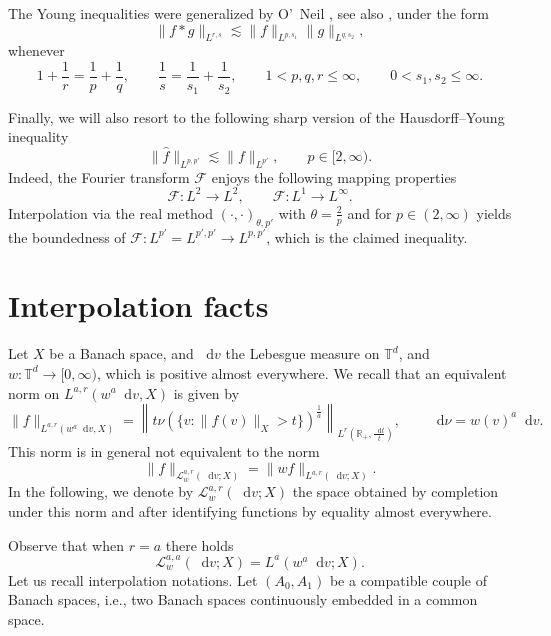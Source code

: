 \documentclass[11pt,a4paper,reqno]{amsart}
\theoremstyle{plain}
\theoremstyle{remark}
\newcommand{\dd}{\mathop{}\!\mathrm{d}}
\begin{document}
The Young inequalities were generalized by O'~Neil \cite{Oneil1963}, see also \cite[p. 73]{grafakos2011classical}, under the form
\begin{equation}
    \label{eq.young-oneil}
    \|f*g\|_{L^{r,s}} \lesssim \|f\|_{L^{p,s_1}}\|g\|_{L^{q,s_2}}, 
\end{equation}
whenever
\[
    1+\frac{1}{r}=\frac{1}{p}+\frac{1}{q}, \qquad \frac{1}{s}=\frac{1}{s_1} + \frac{1}{s_2}, \qquad 1 < p, q, r \leq \infty, \qquad 0<s_1,s_2\leq \infty. 
\]

Finally, we will also resort to the following sharp version of the Hausdorff--Young inequality 
\begin{equation}
    \label{eq.hausdorffYoung-real}
    \|\widehat{f}\|_{L^{p,p'}} \lesssim \|f\|_{L^{p'}}, \qquad p \in [2,\infty).  
\end{equation}
Indeed, the Fourier transform $\mathcal{F}$ enjoys the following mapping properties
\[
    \mathcal{F} : L^2 \to L^2, \qquad \mathcal{F} : L^1 \to L^{\infty}.
\]
Interpolation via the real method $(\cdot,\cdot)_{\theta,p'}$ with $\theta = \frac{2}{p}$ and for $p \in (2,\infty)$ yields the boundedness of $\mathcal{F} : L^{p'}=L^{p',p'} \to L^{p,p'}$, which is the claimed inequality.

\section{Interpolation facts}

Let $X$ be a Banach space, and $\dd v$ the Lebesgue measure on $\mathbb{T}^d$, and $w : \mathbb{T}^d \to [0,\infty)$, which is positive almost everywhere. We recall that an equivalent norm on $L^{a,r}(w^a\dd v, X)$ is given by
\[
    \|f\|_{L^{a,r}(w^a\dd v, X)} = \left\|t \nu\left(\{v : \|f(v)\|_{X}>t\}\right)^{\frac{1}{a}} \right\|_{L^{r}(\mathbb{R}_+,\frac{\dd t}{t})}, \qquad \dd \nu = w(v)^a \dd v.
\]
This norm is in general not equivalent to the norm 
\[
    \|f\|_{\mathcal{L}_w^{a,r}(\dd v;X)} = \|wf\|_{L^{a,r}(\dd v;X)}.
\]
In the following, we denote by $\mathcal{L}_w^{a,r}(\dd v;X)$ the space obtained by completion under this norm and after identifying functions by equality almost everywhere.

Observe that when $r=a$ there holds
\[
    \mathcal{L}^{a,a}_{w}(\dd v;X)=L^a(w^a\dd v;X).
\]
Let us recall interpolation notations. 
Let $(A_0,A_1)$ be a compatible couple of Banach spaces, i.e., two
Banach spaces continuously embedded in a common space.

\medskip
\end{document}
